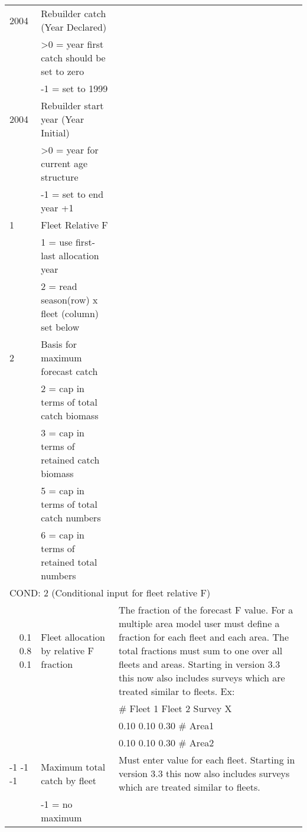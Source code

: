 \begin{landscape}
\begin{longtable}{p{3cm} p{7cm} p{11cm}}
 2004 & Rebuilder catch (Year Declared) & \\
      & >0 = year first catch should be set to zero & \\
      & -1 = set to 1999 & \\
      
 \hline
 2004 & Rebuilder start year (Year Initial) & \\
      & >0 = year for current age structure & \\
      & -1 = set to end year +1 & \\
      
 \hline
 1 & Fleet Relative F & \\
   & 1 = use first-last allocation year & \\
   & 2 = read season(row) x fleet (column) set below & \\
   
 \hline
 2 & Basis for maximum forecast catch &  \\
   & 2 = cap in terms of total catch biomass & \\
   & 3 = cap in terms of retained catch biomass & \\
   & 5 = cap in terms of total catch numbers & \\
   & 6 = cap in terms of retained total numbers & \\
 
 \hline  
 \multicolumn{3}{l}{COND: 2 (Conditional input for fleet relative F)} \\
 \multicolumn{1}{r}{0.1 0.8 0.1}  & Fleet allocation by relative F fraction & The fraction of the forecast F value.  For a multiple area model user must define a fraction for each fleet and each area.  The total fractions must sum to one over all fleets and areas.  Starting in version 3.3 this now also includes surveys which are treated similar to fleets.
 Ex:   \\
   &  &  \# Fleet 1  Fleet 2  Survey X \\ 
   &  &  0.10  0.10  0.30 \# Area1 \\
   &  &  0.10  0.10  0.30 \# Area2 \\  
 \pagebreak
 
 -1 -1 -1 & Maximum total catch by fleet & \multirow{1}{1cm}[-0.1cm]{\parbox{11cm}{Must enter value for each fleet.  Starting in version 3.3 this now also includes surveys which are treated similar to fleets.}} \\
  & -1 = no maximum & \\
  

\end{longtable}
\end{landscape}
